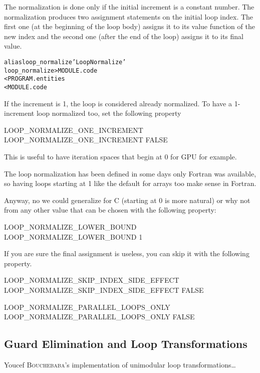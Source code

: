 \documentclass[a4paper]{report}
\newenvironment{PipsMake}{\begin{alltt}}{\end{alltt}}
\begin{document}
The normalization is done only if the initial increment is a constant
number. The normalization produces two assignment statements on the
initial loop index. The first one (at the beginning of the loop body)
assigns it to its value function of the new index and the second one
(after the end of the loop) assigns it to its final value.

\begin{PipsMake}
alias loop_normalize 'Loop Normalize'
loop_normalize          > MODULE.code
        < PROGRAM.entities
        < MODULE.code
\end{PipsMake}

If the increment is 1, the loop is considered already normalized. To have
a 1-increment loop normalized too, set the following property
\begin{PipsProp}{LOOP_NORMALIZE_ONE_INCREMENT}
LOOP_NORMALIZE_ONE_INCREMENT FALSE
\end{PipsProp}
This is useful to have iteration spaces that begin at 0 for GPU for
example.

The loop normalization has been defined in some days only Fortran was
available, so having loops starting at 1 like the default for arrays too
make sense in Fortran.

Anyway, no we could generalize for C (starting at 0 is more natural) or
why not from any other value that can be chosen with the following
property:
\begin{PipsProp}{LOOP_NORMALIZE_LOWER_BOUND}
LOOP_NORMALIZE_LOWER_BOUND 1
\end{PipsProp}

If you are sure the final assignment is useless, you can skip it with the
following property.
\begin{PipsProp}{LOOP_NORMALIZE_SKIP_INDEX_SIDE_EFFECT}
LOOP_NORMALIZE_SKIP_INDEX_SIDE_EFFECT FALSE
\end{PipsProp}


\begin{PipsProp}{LOOP_NORMALIZE_PARALLEL_LOOPS_ONLY}
 LOOP_NORMALIZE_PARALLEL_LOOPS_ONLY FALSE
\end{PipsProp}



\subsection{Guard Elimination and Loop Transformations}
\label{subsection-guard-elimination}

Youcef \textsc{Bouchebaba}'s implementation of unimodular loop
transformations\ldots
\end{document}
